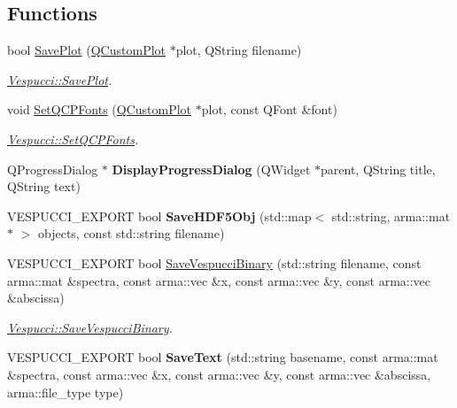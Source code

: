 \subsection*{Functions}
\begin{DoxyCompactItemize}
\item 
bool \hyperlink{namespace_vespucci_ac9e75378ca4f326d27765420a5fe0017}{Save\+Plot} (\hyperlink{class_q_custom_plot}{Q\+Custom\+Plot} $\ast$plot, Q\+String filename)
\begin{DoxyCompactList}\small\item\em \hyperlink{namespace_vespucci_ac9e75378ca4f326d27765420a5fe0017}{Vespucci\+::\+Save\+Plot}. \end{DoxyCompactList}\item 
void \hyperlink{namespace_vespucci_aa3b7c327a9c8fefe9f90b596b0522769}{Set\+Q\+C\+P\+Fonts} (\hyperlink{class_q_custom_plot}{Q\+Custom\+Plot} $\ast$plot, const Q\+Font \&font)
\begin{DoxyCompactList}\small\item\em \hyperlink{namespace_vespucci_aa3b7c327a9c8fefe9f90b596b0522769}{Vespucci\+::\+Set\+Q\+C\+P\+Fonts}. \end{DoxyCompactList}\item 
Q\+Progress\+Dialog $\ast$ {\bfseries Display\+Progress\+Dialog} (Q\+Widget $\ast$parent, Q\+String title, Q\+String text)\hypertarget{namespace_vespucci_a4f75db591f2e347e86636b32e6db914f}{}\label{namespace_vespucci_a4f75db591f2e347e86636b32e6db914f}

\item 
V\+E\+S\+P\+U\+C\+C\+I\+\_\+\+E\+X\+P\+O\+RT bool {\bfseries Save\+H\+D\+F5\+Obj} (std\+::map$<$ std\+::string, arma\+::mat $\ast$ $>$ objects, const std\+::string filename)\hypertarget{namespace_vespucci_a84a238fed7a825d6e31cbad078baa624}{}\label{namespace_vespucci_a84a238fed7a825d6e31cbad078baa624}

\item 
V\+E\+S\+P\+U\+C\+C\+I\+\_\+\+E\+X\+P\+O\+RT bool \hyperlink{namespace_vespucci_a299911f29af64840177d40029c54251c}{Save\+Vespucci\+Binary} (std\+::string filename, const arma\+::mat \&spectra, const arma\+::vec \&x, const arma\+::vec \&y, const arma\+::vec \&abscissa)
\begin{DoxyCompactList}\small\item\em \hyperlink{namespace_vespucci_a299911f29af64840177d40029c54251c}{Vespucci\+::\+Save\+Vespucci\+Binary}. \end{DoxyCompactList}\item 
V\+E\+S\+P\+U\+C\+C\+I\+\_\+\+E\+X\+P\+O\+RT bool {\bfseries Save\+Text} (std\+::string basename, const arma\+::mat \&spectra, const arma\+::vec \&x, const arma\+::vec \&y, const arma\+::vec \&abscissa, arma\+::file\+\_\+type type)\hypertarget{namespace_vespucci_ad8772321651f082e411e98b771aec22a}{}\label{namespace_vespucci_ad8772321651f082e411e98b771aec22a}


\end{DoxyCompactItemize}
